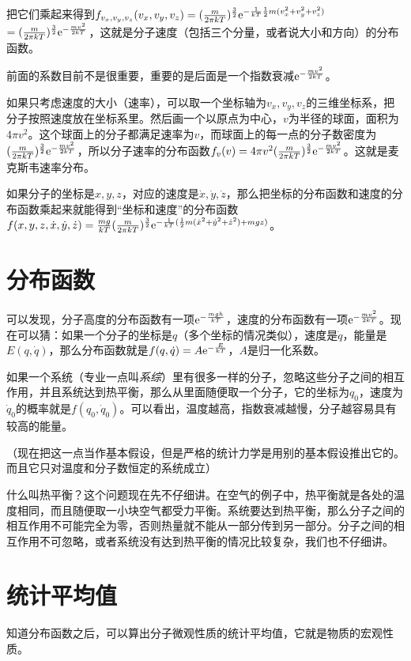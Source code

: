 把它们乘起来得到$f_{v_x,v_y,v_z}(v_x,v_y,v_z)=(\frac{m}{2 \pi k T})^\frac{3}{2} \mathrm{e}^{-\frac{1}{k T} \frac{1}{2} m (v_x^2+v_y^2+v_z^2)}$$=(\frac{m}{2 \pi k T})^\frac{3}{2} \mathrm{e}^{-\frac{m v^2}{2 k T}}$，这就是分子速度（包括三个分量，或者说大小和方向）的分布函数。

前面的系数目前不是很重要，重要的是后面是一个指数衰减$\mathrm{e}^{-\frac{m v^2}{2 k T}}$。

如果只考虑速度的大小（速率），可以取一个坐标轴为$v_x,v_y,v_z$的三维坐标系，把分子按照速度放在坐标系里。然后画一个以原点为中心，$v$为半径的球面，面积为$4 \pi v^2$。这个球面上的分子都满足速率为$v$，而球面上的每一点的分子数密度为$(\frac{m}{2 \pi k T})^\frac{3}{2} \mathrm{e}^{-\frac{m v^2}{2 k T}}$，所以分子速率的分布函数$f_v(v)=4 \pi v^2 (\frac{m}{2 \pi k T})^\frac{3}{2} \mathrm{e}^{-\frac{m v^2}{2 k T}}$。这就是麦克斯韦速率分布。

如果分子的坐标是$x,y,z$，对应的速度是$\dot x,\dot y,\dot z$，那么把坐标的分布函数和速度的分布函数乘起来就能得到“坐标和速度”的分布函数$f(x,y,z,\dot x,\dot y,\dot z)=\frac{m g}{k T} (\frac{m}{2 \pi k T})^\frac{3}{2} \mathrm{e}^{-\frac{1}{k T} (\frac{1}{2} m (\dot x^2+\dot y^2+\dot z^2)+m g z)}$。
\section{分布函数}
可以发现，分子高度的分布函数有一项$\mathrm{e}^{-\frac{m g h}{k T}}$，速度的分布函数有一项$\mathrm{e}^{-\frac{m v^2}{2 k T}}$。现在可以猜：如果一个分子的坐标是$q$（多个坐标的情况类似），速度是$\dot q$，能量是$E(q,\dot q)$，那么分布函数就是$f(q,\dot q)=A \mathrm{e}^{-\frac{E}{k T}}$，$A$是归一化系数。

如果一个系统（专业一点叫\emph{系综}）里有很多一样的分子，忽略这些分子之间的相互作用，并且系统达到热平衡，那么从里面随便取一个分子，它的坐标为$q_0$，速度为$\dot q_0$的概率就是$f(q_0,\dot q_0)$。可以看出，温度越高，指数衰减越慢，分子越容易具有较高的能量。

（现在把这一点当作基本假设，但是严格的统计力学是用别的基本假设推出它的。而且它只对温度和分子数恒定的系统成立）

什么叫热平衡？这个问题现在先不仔细讲。在空气的例子中，热平衡就是各处的温度相同，而且随便取一小块空气都受力平衡。系统要达到热平衡，那么分子之间的相互作用不可能完全为零，否则热量就不能从一部分传到另一部分。分子之间的相互作用不可忽略，或者系统没有达到热平衡的情况比较复杂，我们也不仔细讲。
\section{统计平均值}
知道分布函数之后，可以算出分子微观性质的统计平均值，它就是物质的宏观性质。

